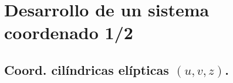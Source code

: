 \documentclass[12pt]{beamer}
\begin{document}

\section{Desarrollo de un sistema coordenado 1/2}
\subsection{Coord. cilíndricas elípticas \texorpdfstring{$(u, v, z)$}{(u, v, z)}.}
\end{document}
